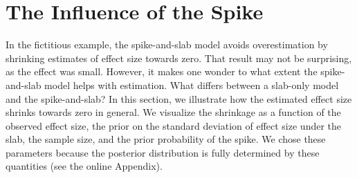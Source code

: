 \documentclass[a4paper]{article}
\newenvironment{revision}{\color{teal}}{\color{black}}
\begin{document}
\begin{revision}%
\section*{The Influence of the Spike}

In the fictitious example, the spike-and-slab model avoids overestimation by shrinking estimates of effect size towards zero.
That result may not be surprising, as the effect was small.
However, it makes one wonder to what extent the spike-and-slab model helps with estimation.
What differs between a slab-only model and the spike-and-slab?
In this section, we illustrate how the estimated effect size shrinks towards zero in general. 
We visualize the shrinkage as a function of the observed effect size, the prior on the standard deviation of effect size under the slab, the sample size, and the prior probability of the spike.
We chose these parameters because the posterior distribution is fully determined by these quantities (see the online Appendix).


\end{revision}
\end{document}
